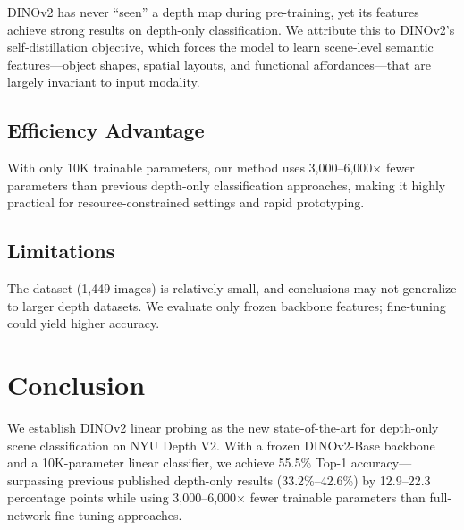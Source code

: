 \documentclass[conference, a4paper]{IEEEtran}
\begin{document}
DINOv2 has never ``seen'' a depth map during pre-training, yet its features achieve
strong results on depth-only classification. We attribute this to DINOv2's
self-distillation objective, which forces the model to learn scene-level semantic
features---object shapes, spatial layouts, and functional affordances---that are
largely invariant to input modality.

\subsection{Efficiency Advantage}

With only 10K trainable parameters, our method uses 3,000--6,000$\times$ fewer
parameters than previous depth-only classification approaches, making it highly
practical for resource-constrained settings and rapid prototyping.

\subsection{Limitations}

The dataset (1,449 images) is relatively small, and conclusions may not generalize to
larger depth datasets. We evaluate only frozen backbone features; fine-tuning could
yield higher accuracy.

\section{Conclusion}

We establish DINOv2 linear probing as the new state-of-the-art for depth-only scene
classification on NYU Depth V2. With a frozen DINOv2-Base backbone and a 10K-parameter
linear classifier, we achieve 55.5\% Top-1 accuracy---surpassing previous published
depth-only results (33.2\%--42.6\%) by 12.9--22.3 percentage points while using
3,000--6,000$\times$ fewer trainable parameters than full-network fine-tuning approaches.
\end{document}
